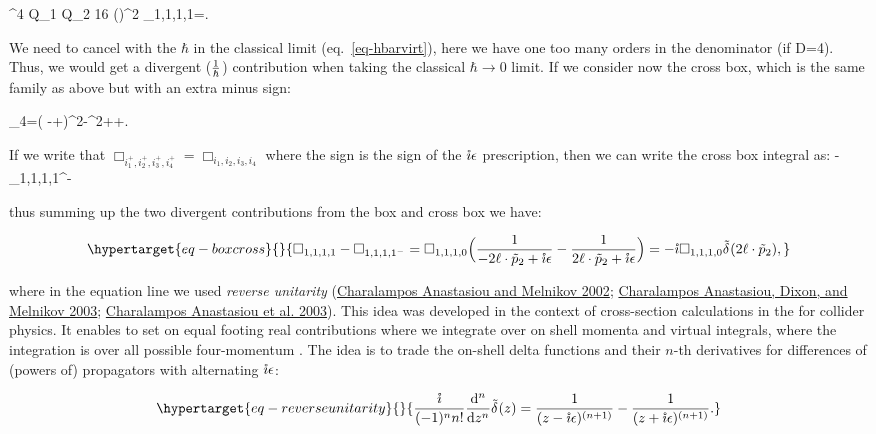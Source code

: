 \documentclass[
  11pt,
  a4paper,
  DIV=11,
  numbers=noendperiod,
  oneside]{scrreprt}
\let\[\relax \let\]\relax %
\DeclareRobustCommand{\[}{\begin{equation}}
\DeclareRobustCommand{\]}{\end{equation}}
\begin{document}
\[
\elch^4 Q_{1} Q_{2} 16 (\semom[1]\cdot \semom[2])^2 \int \dn[D]{{\ell}}\Box_{1,1,1,1}=\order[D-6]{\hbar}.
\]

We need to cancel with the \(\hbar\) in the classical limit
(eq.~\ref{eq-hbarvirt}), here we have one too many orders in the
denominator (if D=4). Thus, we would get a divergent (\(\frac{1}{\hbar}\))
contribution when taking the classical \(\hbar\to 0\) limit. If we
consider now the cross box, which is the same family as above but with
an extra minus sign:

\[
\tilde{\rho}_4=( \Half[q] -\ell+\semom[2])^2-\mass[2]^2+\im \epsilon{}\ell\cdot\semom[2]+\im \epsilon.
\]

If we write that
\(\Box_{i_1^+,i_2^+,i_3^+,i_4^+}=\Box_{i_1,i_2,i_3,i_4}\) where the sign
is the sign of the \(\mathring{\imath}\epsilon\) prescription, then we can write the
cross box integral as: \[
\int \dn[D]{\ell} -\Box_{1,1,1,1^-}
\]

thus summing up the two divergent contributions from the box and cross
box we have:

\begin{equation}\protect\hypertarget{eq-boxcross}{}{
\Box_{1,1,1,1}-\Box_{1,1,1,1^-}=\Box_{1,1,1,0}\pa[\Big]{\inv{-2\ell\cdot\semom[2]+\im \epsilon}-\inv{    2\ell\cdot\semom[2]+\im \epsilon}}=-\im\Box_{1,1,1,0}\ndeltafn{2\ell\cdot\semom[2]},
}\label{eq-boxcross}\end{equation}

where in the equation line we used \emph{reverse unitarity}
(\protect\hyperlink{ref-Anastasiou:2002yz}{Charalampos Anastasiou and
Melnikov 2002}; \protect\hyperlink{ref-Anastasiou:2002qz}{Charalampos
Anastasiou, Dixon, and Melnikov 2003};
\protect\hyperlink{ref-Anastasiou:2003yy}{Charalampos Anastasiou et al.
2003}). This idea was developed in the context of cross-section
calculations in the for collider physics. It enables to set on equal
footing real contributions  where we integrate over on shell momenta
 and virtual integrals,
where the integration is over all possible four-momentum . The idea is to trade the on-shell
delta functions and their \(n\)-th derivatives for differences of
(powers of) propagators with alternating \(\mathring{\imath} \epsilon\):

\begin{equation}\protect\hypertarget{eq-reverseunitarity}{}{
\frac{\im}{(-1)^ nn!} \odv[n]{}{z} \ndeltafn{z}   = \inv{\pa{z  -\im \epsilon}^{(n+1)}}  - \inv{\pa{z+\im \epsilon}^{(n+1)}}.
}\label{eq-reverseunitarity}\end{equation}
\end{document}
